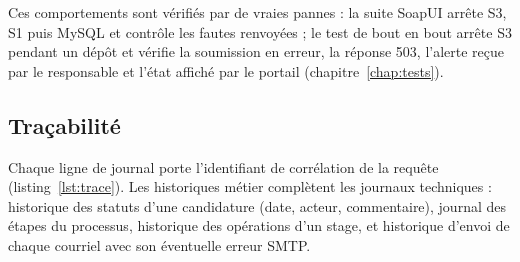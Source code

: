 Ces comportements sont vérifiés par de vraies pannes : la suite SoapUI arrête S3, S1 puis MySQL et contrôle les fautes renvoyées ; le test de bout en bout arrête S3 pendant un dépôt et vérifie la soumission en erreur, la réponse 503, l'alerte reçue par le responsable et l'état affiché par le portail (chapitre~\ref{chap:tests}).

\subsection{Traçabilité}
Chaque ligne de journal porte l'identifiant de corrélation de la requête (listing~\ref{lst:trace}). Les historiques métier complètent les journaux techniques : historique des statuts d'une candidature (date, acteur, commentaire), journal des étapes du processus, historique des opérations d'un stage, et historique d'envoi de chaque courriel avec son éventuelle erreur SMTP.
